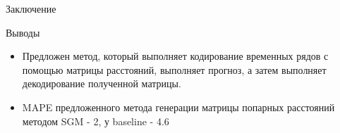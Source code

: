 \documentclass{beamer}
\begin{document}
\begin{frame}{Заключение}
    \begin{block}{Выводы}
    \begin{itemize}
        \item Предложен метод, который выполняет кодирование временных рядов с помощью матрицы расстояний, выполняет прогноз, а затем выполняет декодирование полученной матрицы.

        \item MAPE предложенного метода генерации матрицы попарных расстояний методом SGM - 2, у baseline - 4.6
        
    \end{itemize}
    \end{block}
\end{frame}




 
 
 
\end{document}
